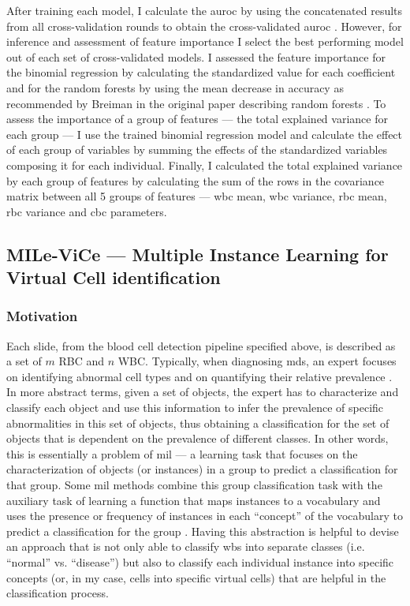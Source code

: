 After training each model, I calculate the \ac{auroc} by using the concatenated results from all cross-validation rounds to obtain the cross-validated \ac{auroc} \cite{Fawcett2006-mo}. However, for inference and assessment of feature importance I select the best performing model out of each set of cross-validated models. I assessed the feature importance for the binomial regression by calculating the standardized value for each coefficient and for the random forests by using the mean decrease in accuracy as recommended by Breiman in the original paper describing random forests \cite{Breiman2001-yz}. To assess the importance of a group of features --- the total explained variance for each group --- I use the trained binomial regression model and calculate the effect of each group of variables by summing the effects of the standardized variables composing it for each individual. Finally, I calculated the total explained variance by each group of features by calculating the sum of the rows in the covariance matrix between all 5 groups of features --- \ac{wbc} mean, \ac{wbc} variance, \ac{rbc} mean, \ac{rbc} variance and \ac{cbc} parameters.

\subsection{MILe-ViCe --- Multiple Instance Learning for Virtual Cell identification}

\subsubsection{Motivation}

Each slide, from the blood cell detection pipeline specified above, is described as a set of $m$ RBC and $n$ WBC. Typically, when diagnosing \ac{mds}, an expert focuses on identifying abnormal cell types and on quantifying their relative prevalence \cite{Valent2017-uh}. In more abstract terms, given a set of objects, the expert has to characterize and classify each object and use this information to infer the prevalence of specific abnormalities in this set of objects, thus obtaining a classification for the set of objects that is dependent on the prevalence of different classes. In other words, this is essentially a problem of \ac{mil} --- a learning task that focuses on the characterization of objects (or instances) in a group to predict a classification for that group. Some \ac{mil} methods combine this group classification task with the auxiliary task of learning a function that maps instances to a vocabulary and uses the presence or frequency of instances in each “concept” of the vocabulary to predict a classification for the group \cite{Amores2013-ym}. Having this abstraction is helpful to devise an approach that is not only able to classify \ac{wbs} into separate classes (i.e. “normal” vs. “disease”) but also to classify each individual instance into specific concepts (or, in my case, cells into specific virtual cells) that are helpful in the classification process. 

